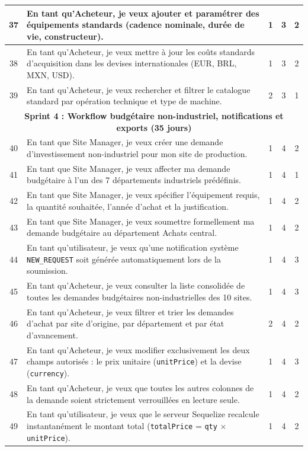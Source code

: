 \begin{longtable}{|c|p{8.8cm}|c|c|c|}
37 & En tant qu'Acheteur, je veux ajouter et paramétrer des équipements standards (cadence nominale, durée de vie, constructeur). & 1 & 3 & 2 \\ \hline
38 & En tant qu'Acheteur, je veux mettre à jour les coûts standards d'acquisition dans les devises internationales (EUR, BRL, MXN, USD). & 1 & 3 & 2 \\ \hline
39 & En tant qu'Acheteur, je veux rechercher et filtrer le catalogue standard par opération technique et type de machine. & 2 & 3 & 1 \\ \hline
\multicolumn{5}{|c|}{\textbf{Sprint 4 : Workflow budgétaire non-industriel, notifications et exports (35 jours)}} \\ \hline
40 & En tant que Site Manager, je veux créer une demande d'investissement non-industriel pour mon site de production. & 1 & 4 & 2 \\ \hline
41 & En tant que Site Manager, je veux affecter ma demande budgétaire à l'un des 7 départements industriels prédéfinis. & 1 & 4 & 1 \\ \hline
42 & En tant que Site Manager, je veux spécifier l'équipement requis, la quantité souhaitée, l'année d'achat et la justification. & 1 & 4 & 2 \\ \hline
43 & En tant que Site Manager, je veux soumettre formellement ma demande budgétaire au département Achats central. & 1 & 4 & 2 \\ \hline
44 & En tant qu'utilisateur, je veux qu'une notification système \texttt{NEW\_REQUEST} soit générée automatiquement lors de la soumission. & 1 & 4 & 3 \\ \hline
45 & En tant qu'Acheteur, je veux consulter la liste consolidée de toutes les demandes budgétaires non-industrielles des 10 sites. & 1 & 4 & 3 \\ \hline
46 & En tant qu'Acheteur, je veux filtrer et trier les demandes d'achat par site d'origine, par département et par état d'avancement. & 2 & 4 & 2 \\ \hline
47 & En tant qu'Acheteur, je veux modifier exclusivement les deux champs autorisés : le prix unitaire (\texttt{unitPrice}) et la devise (\texttt{currency}). & 1 & 4 & 3 \\ \hline
48 & En tant qu'Acheteur, je veux que toutes les autres colonnes de la demande soient strictement verrouillées en lecture seule. & 1 & 4 & 2 \\ \hline
49 & En tant qu'utilisateur, je veux que le serveur Sequelize recalcule instantanément le montant total (\texttt{totalPrice} = \texttt{qty} $\times$ \texttt{unitPrice}). & 1 & 4 & 2 \\ \hline

\end{longtable}
